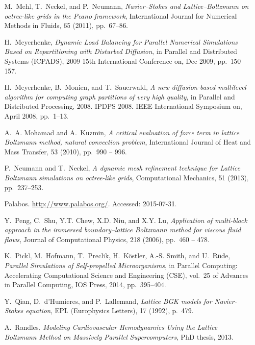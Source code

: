 \documentclass[final,leqno,onefignum,onetabnum]{siamltex1213}
\begin{document}
\begin{thebibliography}{10}
{\sc M.~Mehl, T.~Neckel, and P.~Neumann}, {\em {Navier–Stokes and
  Lattice–Boltzmann on octree-like grids in the Peano framework}},
  International Journal for Numerical Methods in Fluids, 65 (2011), pp.~67--86.

{\sc H.~Meyerhenke}, {\em {Dynamic Load Balancing for Parallel Numerical
  Simulations Based on Repartitioning with Disturbed Diffusion}}, in Parallel
  and Distributed Systems (ICPADS), 2009 15th International Conference on, Dec
  2009, pp.~150--157.

{\sc H.~Meyerhenke, B.~Monien, and T.~Sauerwald}, {\em A new diffusion-based
  multilevel algorithm for computing graph partitions of very high quality}, in
  Parallel and Distributed Processing, 2008. IPDPS 2008. IEEE International
  Symposium on, April 2008, pp.~1--13.

{\sc A.~A. Mohamad and A.~Kuzmin}, {\em A critical evaluation of force term in
  lattice {Boltzmann} method, natural convection problem}, International
  Journal of Heat and Mass Transfer, 53 (2010), pp.~990 -- 996.

{\sc P.~Neumann and T.~Neckel}, {\em A dynamic mesh refinement technique for
  {Lattice Boltzmann} simulations on octree-like grids}, Computational
  Mechanics, 51 (2013), pp.~237--253.

{\sc Palabos}.
\newblock \url{http://www.palabos.org/}.
\newblock Accessed: 2015-07-31.

{\sc Y.~Peng, C.~Shu, Y.T. Chew, X.D. Niu, and X.Y. Lu}, {\em Application of
  multi-block approach in the immersed boundary–lattice {Boltzmann} method
  for viscous fluid flows}, Journal of Computational Physics, 218 (2006),
  pp.~460 -- 478.

{\sc K.~Pickl, M.~Hofmann, T.~Preclik, H.~K\"ostler, A.-S. Smith, and
  U.~R\"ude}, {\em {Parallel Simulations of Self-propelled Microorganisms}}, in
  Parallel Computing: Accelerating Computational Science and Engineering (CSE),
  vol.~25 of Advances in Parallel Computing, IOS Press, 2014, pp.~395--404.

{\sc Y.~Qian, D.~d'Humieres, and P.~Lallemand}, {\em Lattice {BGK} models for
  {Navier-Stokes} equation}, EPL (Europhysics Letters), 17 (1992), p.~479.

{\sc A.~Randles}, {\em {Modeling Cardiovascular Hemodynamics Using the Lattice
  Boltzmann Method on Massively Parallel Supercomputers}}, PhD thesis, 2013.


\end{thebibliography}
\end{document}
